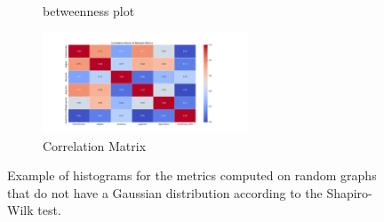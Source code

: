 \begin{figure}
\begin{subfigure}{.33\textwidth}
      \caption{betweenness plot}
      \label{fig:hist5}
    \end{subfigure}
    \begin{subfigure}{.33\textwidth}
      \centering
      \captionsetup{justification=centering}
      \includegraphics[width=1.25\linewidth, height=3cm]{../../results/sub_genre/correlation_matrix.pdf}  %
      \caption{Correlation Matrix}
      \label{fig:hist6}
    \end{subfigure}
    \caption{Example of histograms for the metrics computed on random graphs that do not have a Gaussian distribution according to the Shapiro-Wilk test.}
    \label{fig:hist}
\end{figure}